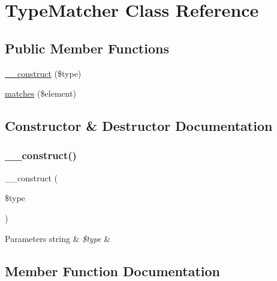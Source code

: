 \hypertarget{class_deep_copy_1_1_type_matcher_1_1_type_matcher}{}\section{Type\+Matcher Class Reference}
\label{class_deep_copy_1_1_type_matcher_1_1_type_matcher}
\subsection*{Public Member Functions}
\begin{DoxyCompactItemize}
\item 
\mbox{\hyperlink{class_deep_copy_1_1_type_matcher_1_1_type_matcher_ac395571e7767c80119b30cf2e5087c59}{\+\_\+\+\_\+construct}} (\$type)
\item 
\mbox{\hyperlink{class_deep_copy_1_1_type_matcher_1_1_type_matcher_a4644566c90bfcb803a927fb9581f64ab}{matches}} (\$element)
\end{DoxyCompactItemize}


\subsection{Constructor \& Destructor Documentation}
\mbox{\label{class_deep_copy_1_1_type_matcher_1_1_type_matcher_ac395571e7767c80119b30cf2e5087c59}} 
\subsubsection{\texorpdfstring{\+\_\+\+\_\+construct()}{\_\_construct()}}
{\footnotesize\ttfamily \+\_\+\+\_\+construct (\begin{DoxyParamCaption}\item[{}]{\$type }\end{DoxyParamCaption})}


\begin{DoxyParams}[1]{Parameters}
string & {\em \$type} & \\
\hline
\end{DoxyParams}


\subsection{Member Function Documentation}
\mbox{\label{class_deep_copy_1_1_type_matcher_1_1_type_matcher_a4644566c90bfcb803a927fb9581f64ab}} 
